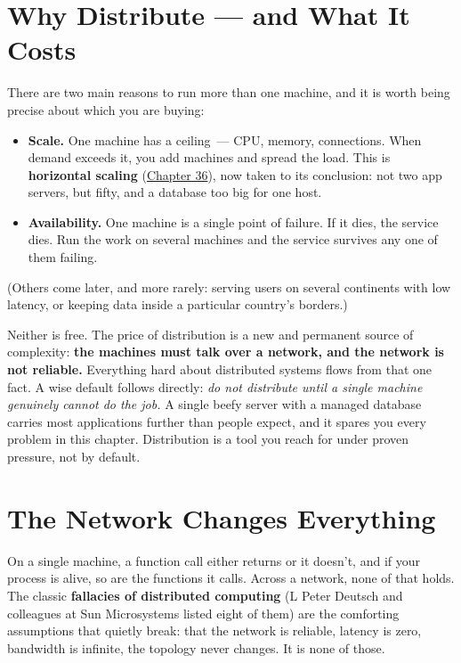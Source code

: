 \setcounter{section}{0}
\section{Why Distribute --- and What It Costs}\label{40-distributed-systems:401-why-distribute--and-what-it-costs}

There are two main reasons to run more than one machine, and it is worth being precise about which you are buying:

\begin{itemize}
\tightlist
\item
  \textbf{Scale.} One machine has a ceiling~--- CPU, memory, connections. When demand exceeds it, you add machines and spread the load. This is \textbf{horizontal scaling} (\hyperref[ch:36-scaling-load]{Chapter 36}), now taken to its conclusion: not two app servers, but fifty, and a database too big for one host.
\item
  \textbf{Availability.} One machine is a single point of failure. If it dies, the service dies. Run the work on several machines and the service survives any one of them failing.
\end{itemize}

\noindent{}(Others come later, and more rarely: serving users on several continents with low latency, or keeping data inside a particular country's borders.)

Neither is free. The price of distribution is a new and permanent source of complexity: \textbf{the machines must talk over a network, and the network is not reliable.} Everything hard about distributed systems flows from that one fact. A wise default follows directly: \emph{do not distribute until a single machine genuinely cannot do the job.} A single beefy server with a managed database carries most applications further than people expect, and it spares you every problem in this chapter. Distribution is a tool you reach for under proven pressure, not by default.

\setcounter{section}{1}
\section{The Network Changes Everything}\label{40-distributed-systems:402-the-network-changes-everything}

On a single machine, a function call either returns or it doesn't, and if your process is alive, so are the functions it calls. Across a network, none of that holds. The classic \textbf{fallacies of distributed computing} (L Peter Deutsch and colleagues at Sun Microsystems listed eight of them) are the comforting assumptions that quietly break: that the network is reliable, latency is zero, bandwidth is infinite, the topology never changes. It is none of those.

